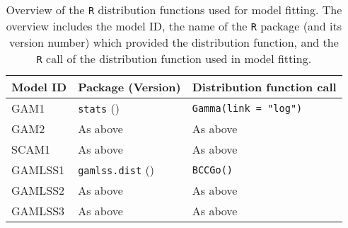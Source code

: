 \begin{table}[H]
  {\tabulinesep=2mm
    \begin{longtabu}{L l l}
      \caption{Overview of the \texttt{R} distribution functions used for model fitting.  The overview includes
        the model ID,
        the name of the \texttt{R} package (and its version number) which provided the distribution function,
        and the \texttt{R} call of the distribution function used in model fitting.
        \label{tab:PresentedModelsOverviewDistributions}} \\
      \toprule
      Model ID & Package (Version) & Distribution function call \\
      \midrule
      \endhead
      \bottomrule
      \endlastfoot
      GAM1 & \texttt{stats} (\statsPackageVersion{}) & \texttt{Gamma(link = "log")} \\
      GAM2 & As above & As above \\
      SCAM1 & As above & As above \\
      GAMLSS1 & \texttt{gamlss.dist} (\gamlssdistPackageVersion{}) & \texttt{BCCGo()} \\
      GAMLSS2 & As above & As above \\
      GAMLSS3 & As above & As above \\
      \bottomrule
    \end{longtabu}}
\end{table}

\clearpage{}

